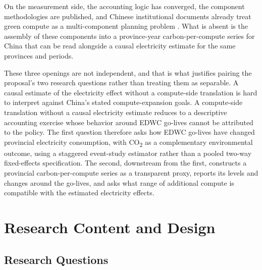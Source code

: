 \documentclass[12pt,a4paper]{article}
\begin{document}
On the measurement side, the accounting logic has converged, the
component methodologies are published, and Chinese institutional
documents already treat green compute as a multi-component planning
problem \citep{guptaetal-2022-chasingcarbonelusive,
chinaacademyofinformationandcommunicationstechnologyhoringernewarea-2024-zhongguolusesuanlifazhanyanjiubaogao2024nian}.
What is absent is the assembly of these components into a
province-year carbon-per-compute series for China that can be read
alongside a causal electricity estimate for the same provinces and
periods.

These three openings are not independent, and that is what justifies
pairing the proposal's two research questions rather than treating
them as separable. A causal estimate of the electricity effect
without a compute-side translation is hard to interpret against
China's stated compute-expansion goals. A compute-side translation
without a causal electricity estimate reduces to a descriptive
accounting exercise whose behavior around EDWC go-lives cannot be
attributed to the policy. The first question therefore asks how EDWC
go-lives have changed provincial electricity consumption, with
CO\textsubscript{2} as a complementary environmental outcome, using
a staggered event-study estimator rather than a pooled two-way
fixed-effects specification. The second, downstream from the first,
constructs a provincial carbon-per-compute series as a transparent
proxy, reports its levels and changes around the go-lives, and asks
what range of additional compute is compatible with the estimated
electricity effects.



\section{Research Content and Design}

\subsection{Research Questions}
%
%
\end{document}
